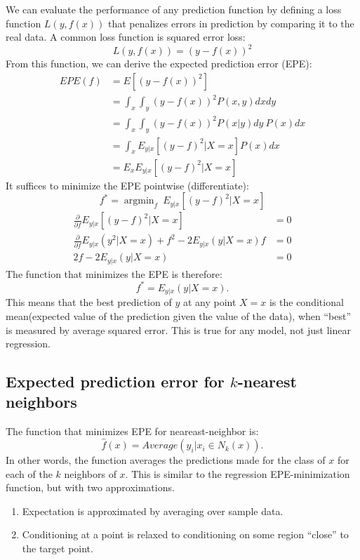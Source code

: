 \documentclass[a4paper,12pt]{article}
\DeclareMathOperator*{\argmin}{argmin}
\begin{document}
We can evaluate the performance of any prediction function by defining a loss function $L(y, f(x))$ that penalizes errors in prediction by comparing it to the real data. A common loss function is squared error loss: 
$$L(y, f(x)) = (y - f(x))^2$$
From this function, we can derive the expected prediction error (EPE): 
\begin{align*}
EPE(f) &= E\left[(y-f(x))^2\right]\\
	   &= \int_x \int_y (y-f(x))^2 P(x,y) dx dy\\
	   &= \int_x \int_y (y-f(x))^2 P(x|y)dy~P(x) dx\\
	   &= \int_x E_{y|x} \left[(y-f)^2 | X=x\right]P(x)dx\\
	   &= E_x E_{y|x} \left[(y-f)^2 | X=x\right]
\end{align*}
It suffices to minimize the EPE pointwise (differentiate): 
$$f^* = \argmin_f ~E_{y|x}\left[(y-f)^2 | X=x\right]$$
\begin{align*}
\frac{\partial}{\partial f} E_{y|x}\left[(y-f)^2 | X=x\right] &= 0 \\
\frac{\partial}{\partial f} E_{y|x}(y^2|X=x) + f^2 - 2 E_{y|x}(y|X=x)f &= 0\\
2f - 2 E_{y|x}(y|X=x) &= 0
\end{align*}
The function that minimizes the EPE is therefore: 
$$f^* = E_{y|x} (y | X=x).$$
This means that the best prediction of $y$ at any point $X=x$ is the conditional mean(expected value of the prediction given the value of the data), when ``best'' is measured by average squared error. This is true for any model, not just linear regression. 

\subsection{Expected prediction error for $k$-nearest neighbors}

The function that minimizes EPE for neareast-neighbor is: 
$$\hat f(x) = Average(y_i | x_i \in N_k(x)).$$
In other words, the function averages the predictions made for the class of $x$ for each of the $k$ neighbors of $x$. This is similar to the regression EPE-minimization function, but with two approximations. 
\begin{enumerate}
\item Expectation is approximated by averaging over sample data.
\item Conditioning at a point is relaxed to conditioning on some region ``close'' to the target point. 
\end{enumerate}
\end{document}
